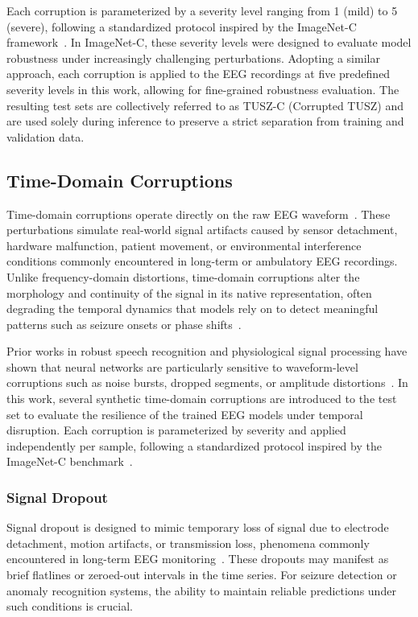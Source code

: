 Each corruption is parameterized by a severity level ranging from 1 (mild) to 5 (severe), following a standardized protocol inspired by the ImageNet-C framework~\cite{benchmarkingneuralnetworkrobustness}. In ImageNet-C, these severity levels were designed to evaluate model robustness under increasingly challenging perturbations. Adopting a similar approach, each corruption is applied to the EEG recordings at five predefined severity levels in this work, allowing for fine-grained robustness evaluation. The resulting test sets are collectively referred to as TUSZ-C (Corrupted TUSZ) and are used solely during inference to preserve a strict separation from training and validation data.

\subsection{Time-Domain Corruptions}
Time-domain corruptions operate directly on the raw EEG waveform~\cite{timedomain}. These perturbations simulate real-world signal artifacts caused by sensor detachment, hardware malfunction, patient movement, or environmental interference conditions commonly encountered in long-term or ambulatory EEG recordings. Unlike frequency-domain distortions, time-domain corruptions alter the morphology and continuity of the signal in its native representation, often degrading the temporal dynamics that models rely on to detect meaningful patterns such as seizure onsets or phase shifts~\cite{timedomain1}.

Prior works in robust speech recognition and physiological signal processing have shown that neural networks are particularly sensitive to waveform-level corruptions such as noise bursts, dropped segments, or amplitude distortions~\cite{timedomain1, timedomain2}. In this work, several synthetic time-domain corruptions are introduced to the test set to evaluate the resilience of the trained EEG models under temporal disruption. Each corruption is parameterized by severity and applied independently per sample, following a standardized protocol inspired by the ImageNet-C benchmark~\cite{benchmarkingneuralnetworkrobustness}.

\subsubsection{Signal Dropout}
Signal dropout is designed to mimic temporary loss of signal due to electrode detachment, motion artifacts, or transmission loss, phenomena commonly encountered in long-term EEG monitoring~\cite{timedomain1}. These dropouts may manifest as brief flatlines or zeroed-out intervals in the time series. For seizure detection or anomaly recognition systems, the ability to maintain reliable predictions under such conditions is crucial.

